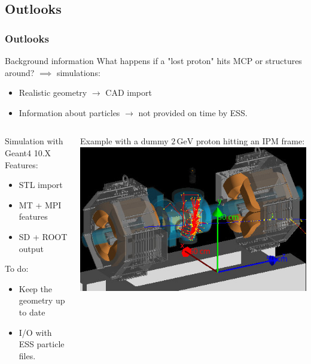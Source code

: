 \subsection{Outlooks}

\begin{frame}
  \frametitle{Outlooks}
  \begin{block}{Background information}
    What happens if a "lost proton" hits MCP or structures around? $\implies$ simulations:
    \begin{itemize}
      \item Realistic geometry $\rightarrow$ CAD import
      \item Information about particles $\rightarrow$ not provided on time by ESS.
    \end{itemize}
  \end{block}
  \begin{columns}[T]
    \begin{column}{0.45\textwidth}
      \begin{block}{Simulation with Geant4 10.X}
        Features:
        \begin{itemize}
          \item STL import
          \item MT + MPI features
          \item SD + ROOT output
        \end{itemize}
        To do:
        \begin{itemize}
          \item Keep the geometry up to date
          \item I/O with ESS particle files.
        \end{itemize}
      \end{block}
    \end{column}
    \begin{column}{0.45\textwidth}
      Example with a dummy $2\,\mathrm{GeV}$ proton hitting an IPM frame:
      \includegraphics[width=1\textwidth]{05_Conclusion/fig/fig000_G4ESS2}
    \end{column}
  \end{columns}
\end{frame}

